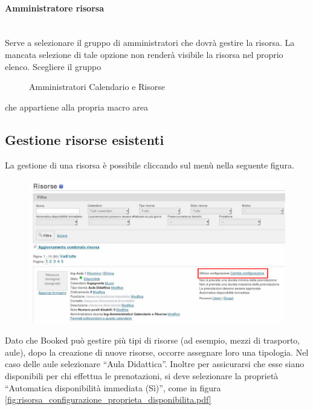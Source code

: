 \paragraph*{Amministratore risorsa}\mbox{}\\ %
Serve a selezionare il gruppo di amministratori che dovrà gestire la risorsa. La mancata selezione
di tale opzione non renderà visibile la risorsa nel proprio elenco.
Scegliere il gruppo
\begin{figure}[H]
\centering{}Amministratori Calendario e Risorse
\normalsize
\end{figure}
che appartiene alla propria macro area


\newpage
\subsection{Gestione risorse esistenti}
La gestione di una risorsa è possibile cliccando sul menù nella seguente figura.


\begin{figure}[H]
\centering{}\includegraphics[scale=0.5]{Immagini/risorsa_selezione_configurazione.pdf}
\normalsize
\caption{}
\label{fig:risorsa_selezione_configurazione.pdf}
\end{figure}

Dato che Booked può gestire più tipi di risorse (ad esempio, mezzi di trasporto, aule),
dopo la creazione di nuove risorse, occorre assegnare loro una tipologia. Nel caso delle
aule selezionare ``Aula Didattica''.
Inoltre per assicurarsi che esse siano disponibili per chi effettua le prenotazioni,
si deve selezionare la proprietà ``Automatica disponibilità immediata (Sì)'', come in figura
\ref{fig:risorsa_configurazione_proprieta_disponibilita.pdf}

